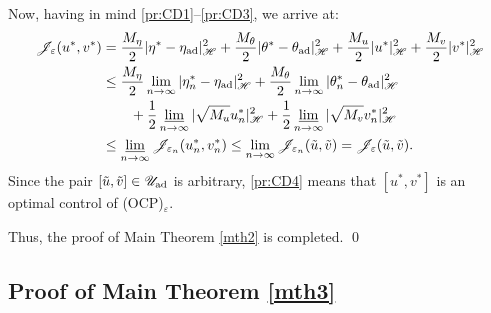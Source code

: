 \documentclass{sinst}
\numberwithin{equation}{section}
\theoremstyle{plain}
\theoremstyle{definition}
\def\sH{\mathscr{H}}
\def\sJ{\mathscr{J}}
\def\sU{\mathscr{U}}
\def\ad{{\rm ad}}
\begin{document}
Now, having in mind \eqref{pr:CD1}--\eqref{pr:CD3}, we arrive at:
\begin{align}
  \sJ_\varepsilon(u^*, v^*) &= \frac{M_\eta}{2}|\eta^* - \eta_\ad|_\sH^2 + \frac{M_\theta}{2} |\theta^* - \theta_\ad|_\sH^2 + \frac{M_u}{2} |u^*|_\sH^2 + \frac{M_v}{2} |v^*|_\sH^2 
  \\
  &\leq \frac{M_\eta}{2}\lim_{n \to \infty} |\eta_n^* - \eta_\ad|_\sH^2 + \frac{M_\theta}{2} \lim_{n \to \infty}|\theta_n^* - \theta_\ad|_\sH^2 \label{pr:CD4}
  \\
  &\qquad + \frac{1}{2} \varliminf_{n \to \infty} |\sqrt{M_u} u_n^*|_\sH^2 + \frac{1}{2} \varliminf_{n \to \infty} |\sqrt{M_v} v_n^*|_\sH^2
  \\
  &\leq \varliminf_{n \to \infty} \sJ_{\varepsilon_n}(u_n^*, v_n^*) \leq \lim_{n \to \infty} \sJ_{\varepsilon_n} (\tilde u, \tilde v) = \sJ_\varepsilon (\tilde u, \tilde v).
\end{align}
Since the pair $[\tilde u, \tilde v] \in \sU_\ad$ is arbitrary, \eqref{pr:CD4} means that $[u^*, v^*]$ is an optimal control of (OCP)$_\varepsilon$.

Thus, the proof of Main Theorem \ref{mth2} is completed. \qed




\subsection{Proof of Main Theorem \ref{mth3}} \label{proof3}
\end{document}
